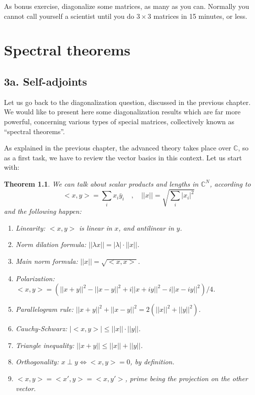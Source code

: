 \documentclass[12pt]{amsbook}
\newtheorem{theorem}{Theorem}[chapter]
\begin{document}
As bonus exercise, diagonalize some matrices, as many as you can. Normally you cannot call yourself a scientist until you do $3\times3$ matrices in 15 minutes, or less.

\chapter{Spectral theorems}

\section*{3a. Self-adjoints}

Let us go back to the diagonalization question, discussed in the previous chapter. We would like to present here some diagonalization results which are far more powerful, concerning various types of special matrices, collectively known as ``spectral theorems''. 

\bigskip

As explained in the previous chapter, the advanced theory takes place over $\mathbb C$, so as a first task, we have to review the vector basics in this context. Let us start with:

\begin{theorem}
We can talk about scalar products and lengths in $\mathbb C^N$, according to
$$<x,y>=\sum_ix_i\bar{y}_i\quad,\quad ||x||=\sqrt{\sum_i|x_i|^2}$$
and the following happen:
\begin{enumerate}
\item Linearity: $<x,y>$ is linear in $x$, and antilinear in $y$.

\item Norm dilation formula: $||\lambda x||=|\lambda|\cdot||x||$.

\item Main norm formula: $||x||=\sqrt{<x,x>}$.

\item Polarization: $<x,y>
=(||x+y||^2-||x-y||^2
+i||x+iy||^2-i||x-iy||^2)/4$.

\item Parallelogram rule: $||x+y||^2+||x-y||^2=2(||x||^2+||y||^2)$.

\item Cauchy-Schwarz: $|<x,y>|\leq||x||\cdot||y||$.

\item Triangle inequality: $||x+y||\leq||x||+||y||$.

\item Orthogonality: $x\perp y\iff<x,y>=0$, by definition.

\item $<x,y>=<x',y>=<x,y'>$, prime being the projection on the other vector.
\end{enumerate}
\end{theorem}
\end{document}
